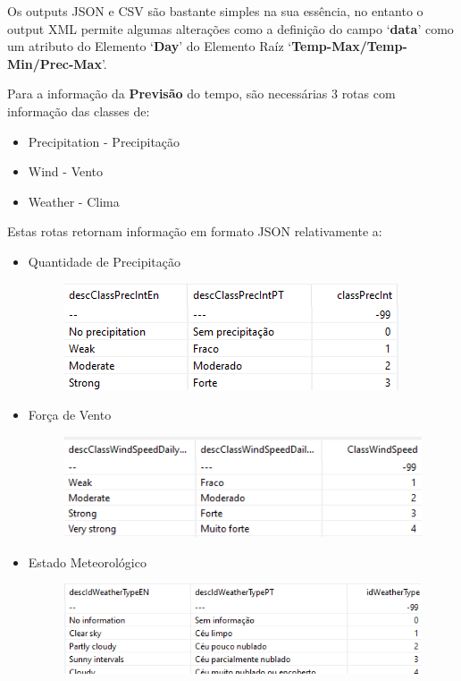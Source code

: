 Os outputs JSON e CSV são bastante simples na sua essência, no entanto o output XML permite algumas alterações como a definição do campo `\textbf{data}' como um atributo do Elemento `\textbf{Day}' do Elemento Raíz `\textbf{Temp-Max/Temp-Min/Prec-Max}'.

Para a informação da \textbf{Previsão} do tempo, são necessárias 3 rotas com informação das classes de: 
\begin{itemize}
    \item Precipitation - Precipitação
    \item Wind - Vento
    \item Weather - Clima
\end{itemize}

Estas rotas retornam informação em formato JSON relativamente a:
\begin{itemize}
    \item Quantidade de Precipitação
    \begin{figure}[H]
        \centering
        \includegraphics{imagens-spoon/prec-info.png}
    \end{figure}
    \item Força de Vento
    \begin{figure}[H]
        \centering
        \includegraphics{imagens-spoon/wind-info.png}
    \end{figure}
    \item Estado Meteorológico
    \begin{figure}[H]
        \centering
        \includegraphics[scale=0.9]{imagens-spoon/weather-info.png}
    \end{figure}
\end{itemize}

